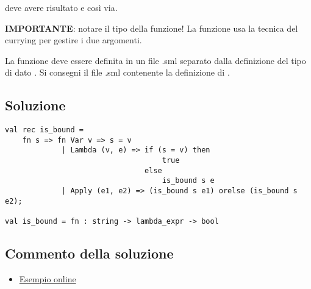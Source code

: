 deve avere risultato  e così via.

\medskip
\textbf{IMPORTANTE}: notare il tipo della funzione! La funzione usa la tecnica del currying per gestire i due argomenti.

La funzione  deve essere definita in un file .sml separato dalla definizione del tipo di dato . Si consegni il file .sml contenente la definizione di .

\subsection*{Soluzione}

\begin{lstlisting}[style = SML, caption = {Definizione della funzione \sml{is_bound}}]
val rec is_bound =
	fn s => fn Var v => s = v
			 | Lambda (v, e) => if (s = v) then
									true
								else
									is_bound s e
			 | Apply (e1, e2) => (is_bound s e1) orelse (is_bound s e2);

val is_bound = fn : string -> lambda_expr -> bool
\end{lstlisting}

\subsection{Commento della soluzione}

\omissis

\begin{itemize}
	\item \href{http://tpcg.io/IQJ8dn}{Esempio online \ExternalLink}
\end{itemize}
